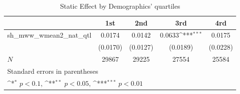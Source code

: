 \begin{table}[htbp]\centering
\def\sym#1{\ifmmode^{#1}\else\(^{#1}\)\fi}
\caption{Static Effect by Demographics' quartiles}
\begin{tabular}{l*{4}{c}}
\hline\hline
            &\multicolumn{1}{c}{1st}&\multicolumn{1}{c}{2nd}&\multicolumn{1}{c}{3rd}&\multicolumn{1}{c}{4rd}\\
\hline
sh\_mww\_wmean2\_nat\_qtl&      0.0174         &      0.0142         &      0.0633\sym{***}&      0.0175         \\
            &    (0.0170)         &    (0.0127)         &    (0.0189)         &    (0.0228)         \\
\hline
\(N\)       &       29867         &       29225         &       27554         &       25584         \\
\hline\hline
\multicolumn{5}{l}{\footnotesize Standard errors in parentheses}\\
\multicolumn{5}{l}{\footnotesize \sym{*} \(p<0.1\), \sym{**} \(p<0.05\), \sym{***} \(p<0.01\)}\\
\end{tabular}
\end{table}
